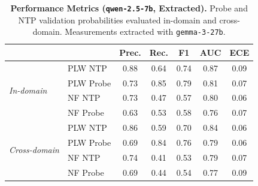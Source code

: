 \begin{table}[ht]
\centering
\begin{tabular}{ll ccccc}
\toprule
& & Prec. & Rec. & F1 & AUC & ECE \\
\midrule
\multirow{4}{*}{\textit{In-domain}}
& PLW NTP & 0.88 & 0.64 & 0.74 & 0.87 & 0.09 \\
& PLW Probe & 0.73 & 0.85 & 0.79 & 0.81 & 0.07 \\
& NF NTP & 0.73 & 0.47 & 0.57 & 0.80 & 0.06 \\
& NF Probe & 0.63 & 0.53 & 0.58 & 0.76 & 0.07 \\
\midrule
\multirow{4}{*}{\textit{Cross-domain}}
& PLW NTP & 0.86 & 0.59 & 0.70 & 0.84 & 0.06 \\
& PLW Probe & 0.69 & 0.84 & 0.76 & 0.79 & 0.06 \\
& NF NTP & 0.74 & 0.41 & 0.53 & 0.79 & 0.07 \\
& NF Probe & 0.69 & 0.44 & 0.54 & 0.77 & 0.09 \\
\bottomrule
\end{tabular}
\caption{\textbf{Performance Metrics (\texttt{qwen-2.5-7b}, Extracted).} Probe and NTP validation probabilities evaluated in-domain and cross-domain. Measurements extracted with \texttt{gemma-3-27b}.}
\label{tab:qwen-2.5-7b-gemma-3-27b-head-real}
\end{table}
